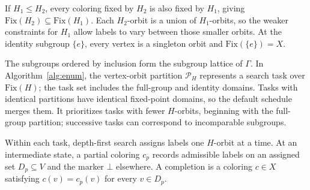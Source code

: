 \documentclass[a5paper, 10pt]{article}
\begin{document}
If $H_1\leq H_2$, every coloring fixed by $H_2$ is also fixed by $H_1$, giving $\mathrm{Fix}(H_2)\subseteq\mathrm{Fix}(H_1)$. Each $H_2$-orbit is a union of $H_1$-orbits, so the weaker constraints for $H_1$ allow labels to vary between those smaller orbits. At the identity subgroup $\{e\}$, every vertex is a singleton orbit and $\mathrm{Fix}(\{e\})=X$.

The subgroups ordered by inclusion form the subgroup lattice of $\Gamma$. In Algorithm~\ref{alg:enum}, the vertex-orbit partition $\mathcal{P}_H$ represents a search task over $\mathrm{Fix}(H)$; the task set includes the full-group and identity domains. Tasks with identical partitions have identical fixed-point domains, so the default schedule merges them. It prioritizes tasks with fewer $H$-orbits, beginning with the full-group partition; successive tasks can correspond to incomparable subgroups.

Within each task, depth-first search assigns labels one $H$-orbit at a time. At an intermediate state, a partial coloring $c_p$ records admissible labels on an assigned set $D_p\subseteq V$ and the marker $\bot$ elsewhere. A completion is a coloring $c\in X$ satisfying $c(v)=c_p(v)$ for every $v\in D_p$.
\end{document}
